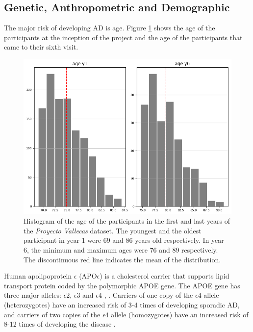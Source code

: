 \documentclass[11pt]{article}
\theoremstyle{definition}
\theoremstyle{remark}
\begin{document}
\subsection{Genetic, Anthropometric and Demographic}
\label{ssse:ant}

The major risk of developing AD is age. Figure \ref{fig:ages} shows the age of the participants at the inception of the project and the age of the participants that came to their sixth visit.

\begin{figure}[H]
        \centering
        \includegraphics[keepaspectratio, width=.6\linewidth]{figures/Fig_ages}
        \caption{Histogram of the age of the participants in the first and last years of the \emph{Proyecto Vallecas} dataset. The youngest and the oldest participant in year 1 were 69 and 86 years old respectively. In year 6, the minimum and maximum ages were 76 and 89 respectively. The discontinuous red line indicates the mean of the distribution.} 
        \label{fig:ages}
\end{figure}

Human apolipoprotein $\epsilon$ (APO$\epsilon$) is a cholesterol carrier that supports lipid transport protein coded by the polymorphic APOE gene. The APOE gene has three major alleles: $\epsilon2$, $\epsilon3$ and $\epsilon4$ \cite{mahley2000apolipoprotein}, \cite{hauser2011apolipoprotein}. Carriers of one copy of the  $\epsilon4$ allele (heterozygotes) have an increased risk of 3-4 times of developing sporadic AD, and carriers of two copies of the $\epsilon4$ allele (homozygotes) have an increased risk of 8-12 times of developing the disease \cite{heffernan2016neurobiology}. 
\end{document}
